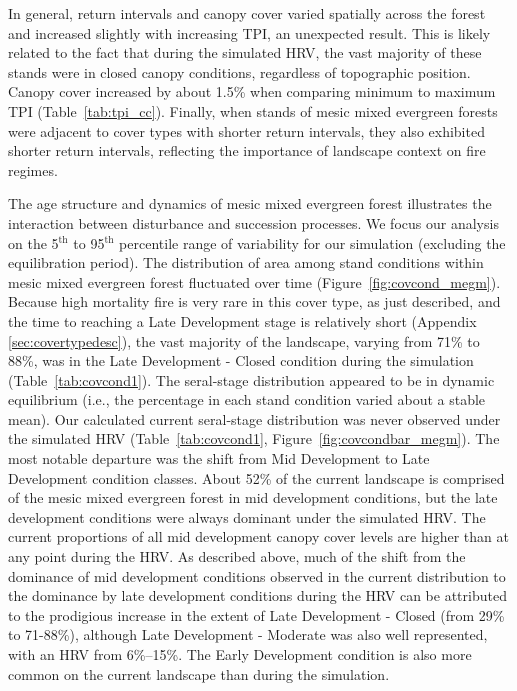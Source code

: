 %
In general, return intervals and canopy cover varied spatially across the forest and increased slightly with increasing TPI, an unexpected result. This is likely related to the fact that during the simulated HRV, the vast majority of these stands were in closed canopy conditions, regardless of topographic position. Canopy cover increased by about 1.5\% when comparing minimum to maximum TPI (Table~\ref{tab:tpi_cc}). %
%
Finally, when stands of mesic mixed evergreen forests were adjacent to cover types with shorter return intervals, they also exhibited shorter return intervals, reflecting the importance of landscape context on fire regimes.

The age structure and dynamics of mesic mixed evergreen forest illustrates the interaction between disturbance and succession processes. We focus our analysis on the 5$^{\text{th}}$ to 95$^{\text{th}}$ percentile range of variability for our simulation (excluding the equilibration period). %
%
The distribution of area among stand conditions within mesic mixed evergreen forest fluctuated over time (Figure~\ref{fig:covcond_megm}). Because high mortality fire is very rare in this cover type, as just described, and the time to reaching a Late Development stage is relatively short (Appendix \ref{sec:covertypedesc}), the vast majority of the landscape, varying from 71\% to 88\%, was in the Late Development - Closed condition during the simulation (Table~\ref{tab:covcond1}). %
%
The seral-stage distribution appeared to be in dynamic equilibrium (i.e., the percentage in each stand condition varied about a stable mean). Our calculated current seral-stage distribution was never observed under the simulated HRV (Table~\ref{tab:covcond1}, Figure~\ref{fig:covcondbar_megm}). The most notable departure was the shift from Mid Development to Late Development condition classes. About 52\% of the current landscape is comprised of the mesic mixed evergreen forest in mid development conditions, but the late development conditions were always dominant under the simulated HRV. The current proportions of all mid development canopy cover levels are higher than at any point during the HRV. As described above, much of the shift from the dominance of mid development conditions observed in the current distribution to the dominance by late development conditions during the HRV can be attributed to the prodigious increase in the extent of Late Development - Closed (from 29\% to 71-88\%), although Late Development - Moderate was also well represented, with an HRV from 6\%--15\%. The Early Development condition is also more common on the current landscape than during the simulation.



